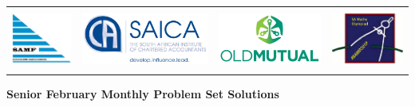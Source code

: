 \documentclass{article}
\begin{document}
\setlength{\tabcolsep}{6pt}
\begin{center} \begin{tabular}{cccc}
	\includegraphics[height=56pt]{SAMF_logo.jpg} &
	\includegraphics[height=56pt]{SAICA_logo.jpg} &
	\includegraphics[height=56pt]{OM_Logo_Stacked_Vignette_on_White_RGB.jpg} &
	\includegraphics[height=56pt]{SAMO2019.png}
\end{tabular} \end{center}


\bigskip


\begin{center}
	\textbf{\Large Senior February Monthly Problem Set Solutions}
\end{center}
\end{document}
